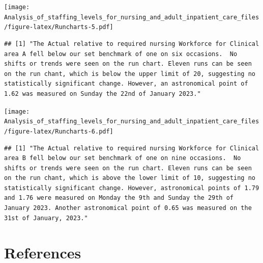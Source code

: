 \documentclass[
]{article}
\begin{document}
\texttt{[image: Analysis\_of\_staffing\_levels\_for\_nursing\_and\_adult\_inpatient\_care\_files/figure-latex/Runcharts-5.pdf]}

\begin{verbatim}
## [1] "The Actual relative to required nursing Workforce for Clinical area A fell below our set benchmark of one on six occasions.  No shifts or trends were seen on the run chart. Eleven runs can be seen on the run chant, which is below the upper limit of 20, suggesting no statistically significant change. However, an astronomical point of 1.62 was measured on Sunday the 22nd of January 2023."
\end{verbatim}

\texttt{[image: Analysis\_of\_staffing\_levels\_for\_nursing\_and\_adult\_inpatient\_care\_files/figure-latex/Runcharts-6.pdf]}

\begin{verbatim}
## [1] "The Actual relative to required nursing Workforce for Clinical area B fell below our set benchmark of one on nine occasions.  No shifts or trends were seen on the run chart. Eleven runs can be seen on the run chant, which is above the lower limit of 10, suggesting no statistically significant change. However, astronomical points of 1.79 and 1.76 were measured on Monday the 9th and Sunday the 29th of January 2023. Another astronomical point of 0.65 was measured on the 31st of January, 2023."
\end{verbatim}

\hypertarget{references}{%
\section*{References}\label{references}}
\end{document}
